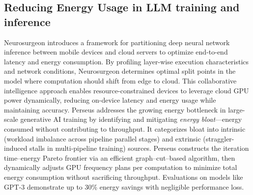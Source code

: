 \subsection{Reducing Energy Usage in LLM training and inference}
Neurosurgeon\cite{neurosurgeon} introduces a framework for partitioning deep neural network inference between mobile devices and cloud servers to optimize end-to-end latency and energy consumption. By profiling layer-wise execution characteristics and network conditions, Neurosurgeon determines optimal split points in the model where computation should shift from edge to cloud. This collaborative intelligence approach enables resource-constrained devices to leverage cloud GPU power dynamically, reducing on-device latency and energy usage while maintaining accuracy. Perseus\cite{chung2024reducing} addresses the growing energy bottleneck in large-scale generative AI training by identifying and mitigating \emph{energy bloat}—energy consumed without contributing to throughput. It categorizes bloat into intrinsic (workload imbalance across pipeline parallel stages) and extrinsic (straggler-induced stalls in multi-pipeline training) sources. Perseus constructs the iteration time–energy Pareto frontier via an efficient graph–cut–based algorithm, then dynamically adjusts GPU frequency plans per computation to minimize total energy consumption without sacrificing throughput. Evaluations on models like GPT-3 demonstrate up to 30\% energy savings with negligible performance loss.
